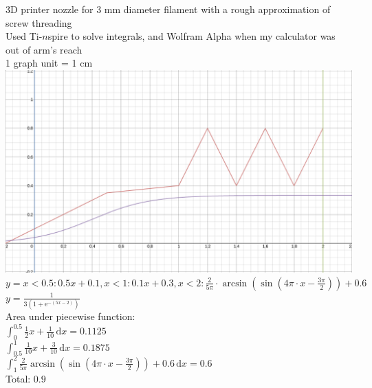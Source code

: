 \documentclass[12pt]{article}
\newcommand{\me}{\mathrm{e}}
\newcommand{\dx}{\mathrm{d}x}
\begin{document}
    \newpage


    
    3D printer nozzle for 3 mm diameter filament with a rough approximation of screw threading\\
    Used Ti-$n$spire to solve integrals, and Wolfram Alpha when my calculator was out of arm's reach\\

    1 graph unit = 1 cm\\
    \includegraphics[scale=.3]{2016-06-06-162120_1026x602_scrot.png}\\


    $y = {x < 0.5: 0.5x + 0.1, x < 1: 0.1x + 0.3, x < 2: \frac{2}{5\pi}\cdot\arcsin{(\sin{(4\pi\cdot x - \frac{3\pi}{2})})} + 0.6}$\\
    $y = \frac{1}{3(1 + \me^{-(5x-2)})}$\\

    Area under piecewise function:\\
    $\int_{0}^{0.5}\! \frac{1}{2}x + \frac{1}{10}\,\dx = 0.1125$\\
    $\int_{0.5}^{1}\! \frac{1}{10}x + \frac{3}{10}\,\dx = 0.1875$\\
    $\int_{1}^{2}\!    \frac{2}{5\pi}\arcsin{(\sin{(4\pi\cdot x - \frac{3\pi}{2})})} + 0.6    \,\dx = 0.6$\\
    Total: $0.9$\\\\
\end{document}
